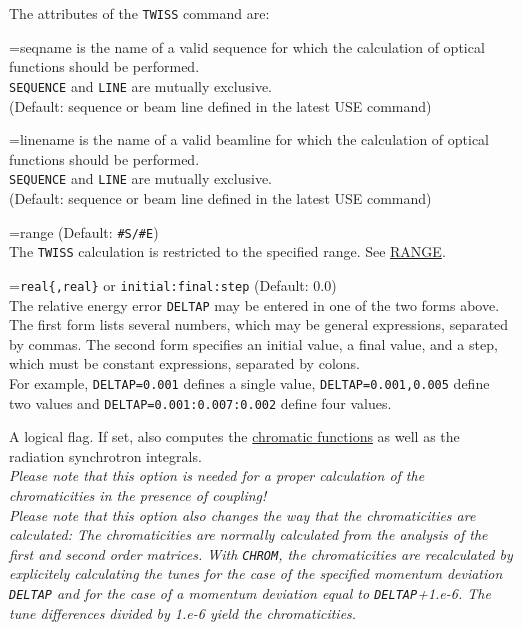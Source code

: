 The  attributes of the \texttt{TWISS} command are: 
\begin{madlist}
    =seqname is the name of a valid sequence for
  which the calculation of optical functions should be performed. \\ 
  \texttt{SEQUENCE} and \texttt{LINE} are mutually exclusive.\\
  (Default: sequence or beam line defined in the latest USE command)

   =linename is the name of a valid beamline for which
  the calculation of optical functions should be performed. \\
  \texttt{SEQUENCE} and \texttt{LINE} are mutually exclusive.\\
  (Default: sequence or beam line defined in the latest USE command)
  
  =range (Default: \texttt{\#S/\#E})\\
  The \texttt{TWISS} calculation is restricted to the specified range.
  See \href{../Introduction/ranges.html#range}{RANGE}.  

  ={\tt real\{,real\}} or {\tt initial:final:step}
  (Default: 0.0)\\ 
  The relative energy error \texttt{DELTAP} may be entered in one of the
  two forms above. \\ 
  The first form lists several numbers, which may be general expressions,
  separated by commas. The second form specifies an initial value, a final
  value, and a step, which must be constant expressions, separated by
  colons. \\
  For example, \texttt{DELTAP=0.001} defines a single value, 
  \texttt{DELTAP=0.001,0.005} define two values and 
  \texttt{DELTAP=0.001:0.007:0.002} define four values. 


   A logical flag. If set, \madx also computes the
  \href{../Introduction/tables.html#chrom}{chromatic
    functions} as well as the radiation synchrotron integrals. \\
  \textit{Please note that this option is needed for a proper
    calculation of the chromaticities in the presence of coupling!}\\
  \textit{Please note that this option also changes the way that the
    chromaticities are calculated: The chromaticities are normally
    calculated from the analysis of the first and second order
    matrices. With \texttt{CHROM}, the chromaticities are recalculated by
    explicitely calculating the tunes for the case of the specified momentum
    deviation \texttt{DELTAP} and for the case of a momentum deviation equal
    to \texttt{DELTAP}+1.e-6. The tune differences divided by 1.e-6 yield the
    chromaticities.}


\end{madlist}
